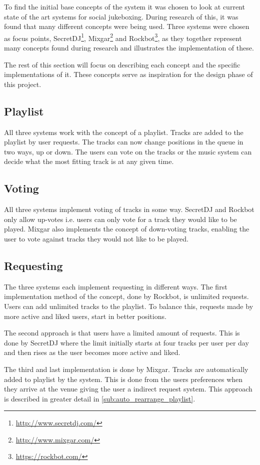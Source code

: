 To find the initial base concepts of the system it was chosen to look at current state of the art systems for social jukeboxing. During research of this, it was found that many different concepts were being used. Three systems were chosen as focus points, SecretDJ\footnote{\url{http://www.secretdj.com/}}, Mixgar\footnote{\url{http://www.mixgar.com/}} and Rockbot\footnote{\url{https://rockbot.com/}}, as they together represent many concepts found during research and illustrates the implementation of these.

The rest of this section will focus on describing each concept and the specific implementations of it. These concepts serve as inspiration for the design phase of this project.

\subsection{Playlist}
All three systems work with the concept of a playlist. Tracks are added to the playlist by user requests. The tracks can now change positions in the queue in two ways, up or down. The users can vote on the tracks or the music system can decide what the most fitting track is at any given time.

\subsection{Voting}
\label{Voting}
All three systems implement voting of tracks in some way. SecretDJ and Rockbot only allow up-votes i.e. users can only vote for a track they would like to be played. Mixgar also implements the concept of down-voting tracks, enabling the user to vote against tracks they would not like to be played.

\subsection{Requesting}
The three systems each implement requesting in different ways. The first implementation method of the concept, done by Rockbot, is unlimited requests. Users can add unlimited tracks to the playlist. To balance this, requests made by more active and liked
users, start in better positions.

The second approach is that users have a limited amount of requests. This is done by SecretDJ where the limit initially starts at four tracks per user per day and then rises as the user becomes more active and liked.

The third and last implementation is done by Mixgar. Tracks are  automatically added to playlist by the system. This is done from the users preferences when they arrive at the venue giving the user a indirect request system. This approach is described in greater detail in \cref{sub:auto_rearrange_playlist}.

